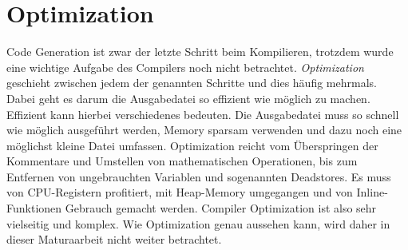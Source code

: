 \section{Optimization}
Code Generation ist zwar der letzte Schritt beim Kompilieren, trotzdem wurde eine wichtige Aufgabe des Compilers noch nicht betrachtet. \textit{Optimization} geschieht zwischen jedem der genannten Schritte und dies häufig mehrmals.
Dabei geht es darum die Ausgabedatei so effizient wie möglich zu machen. Effizient kann hierbei verschiedenes bedeuten.
Die Ausgabedatei muss so schnell wie möglich ausgeführt werden, Memory sparsam verwenden und dazu noch eine möglichst kleine Datei umfassen. 
Optimization reicht vom Überspringen der Kommentare und Umstellen von mathematischen Operationen, bis zum Entfernen von ungebrauchten Variablen und sogenannten Deadstores.
Es muss von CPU-Registern profitiert, mit Heap-Memory umgegangen und von Inline-Funktionen Gebrauch gemacht werden. Compiler Optimization ist also sehr vielseitig und komplex.
Wie Optimization genau aussehen kann, wird daher in dieser Maturaarbeit nicht weiter betrachtet.